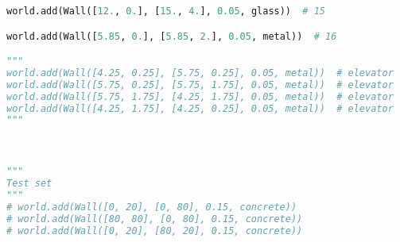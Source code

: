 \begin{lstlisting}[language=python]
world.add(Wall([12., 0.], [15., 4.], 0.05, glass))  # 15

world.add(Wall([5.85, 0.], [5.85, 2.], 0.05, metal))  # 16

"""
world.add(Wall([4.25, 0.25], [5.75, 0.25], 0.05, metal))  # elevator
world.add(Wall([5.75, 0.25], [5.75, 1.75], 0.05, metal))  # elevator
world.add(Wall([5.75, 1.75], [4.25, 1.75], 0.05, metal))  # elevator
world.add(Wall([4.25, 1.75], [4.25, 0.25], 0.05, metal))  # elevator
"""



"""
Test set
"""
# world.add(Wall([0, 20], [0, 80], 0.15, concrete))
# world.add(Wall([80, 80], [0, 80], 0.15, concrete))
# world.add(Wall([0, 20], [80, 20], 0.15, concrete))

\end{lstlisting}